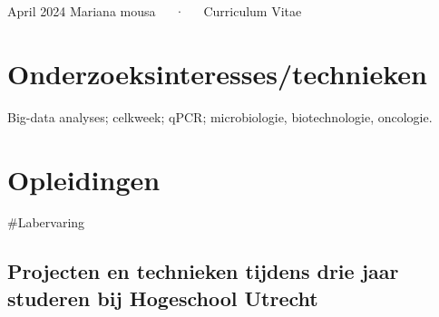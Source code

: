 \documentclass[11pt,a4paper,]{awesome-cv}
\begin{document}
\makecvheader

\makecvfooter
  {April 2024}
    {Mariana mousa~~~·~~~Curriculum Vitae}
  {\thepage}





\hypertarget{onderzoeksinteressestechnieken}{%
\section{Onderzoeksinteresses/technieken}\label{onderzoeksinteressestechnieken}}

Big-data analyses; celkweek; qPCR; microbiologie, biotechnologie,
oncologie.

\hypertarget{opleidingen}{%
\section{Opleidingen}\label{opleidingen}}

\begin{cventries}
    \vspace{-4.0mm}
    \vspace{-4.0mm}
    \vspace{-4.0mm}
\end{cventries}

\#Labervaring

\hypertarget{projecten-en-technieken-tijdens-drie-jaar-studeren-bij-hogeschool-utrecht}{%
\subsection{Projecten en technieken tijdens drie jaar studeren bij
Hogeschool
Utrecht}\label{projecten-en-technieken-tijdens-drie-jaar-studeren-bij-hogeschool-utrecht}}
\end{document}
